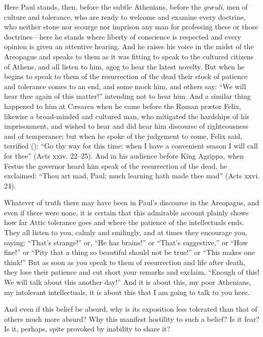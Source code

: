 Here Paul stands, then, before the subtle Athenians, before the
\textit{gr\ae uli}, men of culture and tolerance, who are ready to
welcome and examine every doctrine, who neither stone nor scourge nor
imprison any man for professing these or those doc\-trines---here he
stands where liberty of conscience is respected and every opinion is
given an attentive hearing. And he raises his voice in the midst of
the Areopagus and speaks to them as it was fitting to speak to the
cultured citizens of Athens, and all listen to him, agog to hear the
latest novelty. But when he begins to speak to them of the
resurrection of the dead their stock of patience and tolerance comes
to an end, and some mock him, and others say: ``We will hear thee
again of this matter!'' intending not to hear him. And a similar thing
happened to him at C\ae sarea when he came before the Roman pr\ae tor
Felix, likewise a broad-minded and cultured man, who mitigated the
hardships of his imprisonment, and wished to hear and did hear him
discourse of righteousness and of temperance; but when he spoke of the
judgement to come, Felix said, terrified ():
``Go thy way for this time; when I have a convenient season I will
call for thee'' (Acts xxiv. 22--25). And in his audience before King
Agrippa, when Festus the governor heard him speak of the resurrection
of the dead, he exclaimed: ``Thou art mad, Paul; much learning hath
made thee mad'' (Acts xxvi. 24).

Whatever of truth there may have been in Paul's discourse in the
Areopagus, and even if there were none, it is certain that this
admirable account plainly shows how far Attic tolerance goes and where
the patience of the intellectuals ends. They all listen to you, calmly
and smilingly, and at times they encourage you, saying: ``That's
strange!'' or, ``He has brains!'' or ``That's suggestive,'' or ``How
fine!'' or ``Pity that a thing so  beautiful should not be
true!'' or ``This makes one think!'' But as soon as you speak to them
of resurrection and life after death, they lose their patience and cut
short your remarks and exclaim, ``Enough of this! We will talk about
this another day!'' And it is about this, my poor Athenians, my
intolerant intellectuals, it is about this that I am going to talk to
you here.

And even if this belief be absurd, why is its exposition less
tolerated than that of others much more absurd? Why this manifest
hostility to such a belief? Is it fear? Is it, perhaps, spite provoked
by inability to share it?

